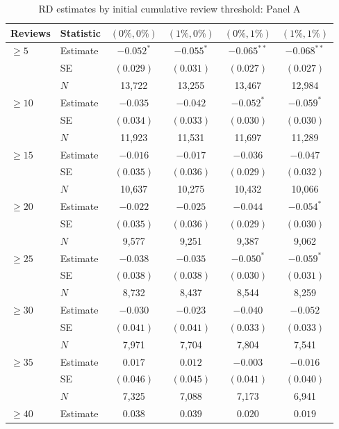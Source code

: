 \begin{table}[!htbp]
\centering
\caption{RD estimates by initial cumulative review threshold: Panel A}
\label{tab:review_threshold_5to40_panel_a}
\small
\begin{tabular}{llcccc}
\toprule
Reviews & Statistic & $(0\%,0\%)$ & $(1\%,0\%)$ & $(0\%,1\%)$ & $(1\%,1\%)$ \\
\midrule
$\geq 5$ & Estimate & $-0.052^{*}$ & $-0.055^{*}$ & $-0.065^{**}$ & $-0.068^{**}$ \\
 & SE & $(0.029)$ & $(0.031)$ & $(0.027)$ & $(0.027)$ \\
 & $N$ & 13,722 & 13,255 & 13,467 & 12,984 \\
\addlinespace
$\geq 10$ & Estimate & $-0.035$ & $-0.042$ & $-0.052^{*}$ & $-0.059^{*}$ \\
 & SE & $(0.034)$ & $(0.033)$ & $(0.030)$ & $(0.030)$ \\
 & $N$ & 11,923 & 11,531 & 11,697 & 11,289 \\
\addlinespace
$\geq 15$ & Estimate & $-0.016$ & $-0.017$ & $-0.036$ & $-0.047$ \\
 & SE & $(0.035)$ & $(0.036)$ & $(0.029)$ & $(0.032)$ \\
 & $N$ & 10,637 & 10,275 & 10,432 & 10,066 \\
\addlinespace
$\geq 20$ & Estimate & $-0.022$ & $-0.025$ & $-0.044$ & $-0.054^{*}$ \\
 & SE & $(0.035)$ & $(0.036)$ & $(0.029)$ & $(0.030)$ \\
 & $N$ & 9,577 & 9,251 & 9,387 & 9,062 \\
\addlinespace
$\geq 25$ & Estimate & $-0.038$ & $-0.035$ & $-0.050^{*}$ & $-0.059^{*}$ \\
 & SE & $(0.038)$ & $(0.038)$ & $(0.030)$ & $(0.031)$ \\
 & $N$ & 8,732 & 8,437 & 8,544 & 8,259 \\
\addlinespace
$\geq 30$ & Estimate & $-0.030$ & $-0.023$ & $-0.040$ & $-0.052$ \\
 & SE & $(0.041)$ & $(0.041)$ & $(0.033)$ & $(0.033)$ \\
 & $N$ & 7,971 & 7,704 & 7,804 & 7,541 \\
\addlinespace
$\geq 35$ & Estimate & $0.017$ & $0.012$ & $-0.003$ & $-0.016$ \\
 & SE & $(0.046)$ & $(0.045)$ & $(0.041)$ & $(0.040)$ \\
 & $N$ & 7,325 & 7,088 & 7,173 & 6,941 \\
\addlinespace
$\geq 40$ & Estimate & $0.038$ & $0.039$ & $0.020$ & $0.019$ \\

\end{tabular}
\end{table}
